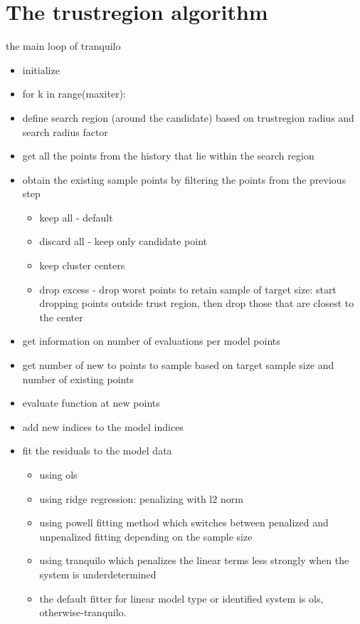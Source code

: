 \section{The trustregion algorithm}
\label{sec:algo}
the main loop of tranquilo
\begin{itemize}
    \item initialize
   \item for k in range(maxiter):
   \item define search region (around the candidate) based on trustregion radius and search radius factor
   \item get all the points from the history that lie within the search region
   \item obtain the existing sample points by filtering the points from the previous step
        \begin{itemize}
            \item keep all - default
            \item discard all - keep only candidate point
            \item keep cluster centers
            \item drop excess - drop worst points to retain sample of target size: start dropping points outside trust region, then drop those that are closest to the center
        \end{itemize}
   \item get information on number of evaluations per model points
   \item get number of new to points to sample based on target sample size and number of existing points
   \item evaluate function at new points
   \item add new indices to the model indices
   \item fit the residuals to the model data
        \begin{itemize}
            \item using ols
            \item using ridge regression: penalizing with l2 norm
            \item using powell fitting method which switches between penalized and unpenalized fitting depending on the sample size
            \item using tranquilo which penalizes the linear terms less strongly when the system is underdetermined
            \item the default fitter for linear model type or identified system is ols, otherwise-tranquilo.

\end{itemize}
\end{itemize}
